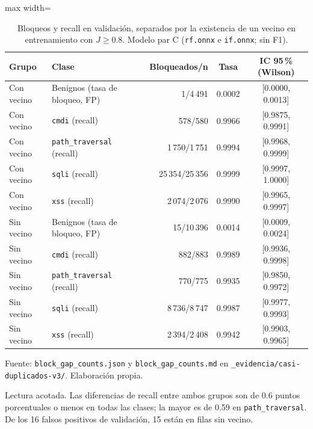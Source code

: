 \begin{table}[htbp]
\centering
\footnotesize
\begin{adjustbox}{max width=\linewidth}
\begin{tabular}{|l|l|r|c|c|}
\hline
\textbf{Grupo} & \textbf{Clase} & \textbf{Bloqueados/n} & \textbf{Tasa} & \textbf{IC 95\,\% (Wilson)} \\ \hline
Con vecino & Benignos (tasa de bloqueo, FP) & 1/4\,491 & 0.0002 & [0.0000, 0.0013] \\ \hline
Con vecino & \texttt{cmdi} (recall) & 578/580 & 0.9966 & [0.9875, 0.9991] \\ \hline
Con vecino & \texttt{path\_traversal} (recall) & 1\,750/1\,751 & 0.9994 & [0.9968, 0.9999] \\ \hline
Con vecino & \texttt{sqli} (recall) & 25\,354/25\,356 & 0.9999 & [0.9997, 1.0000] \\ \hline
Con vecino & \texttt{xss} (recall) & 2\,074/2\,076 & 0.9990 & [0.9965, 0.9997] \\ \hline
Sin vecino & Benignos (tasa de bloqueo, FP) & 15/10\,396 & 0.0014 & [0.0009, 0.0024] \\ \hline
Sin vecino & \texttt{cmdi} (recall) & 882/883 & 0.9989 & [0.9936, 0.9998] \\ \hline
Sin vecino & \texttt{path\_traversal} (recall) & 770/775 & 0.9935 & [0.9850, 0.9972] \\ \hline
Sin vecino & \texttt{sqli} (recall) & 8\,736/8\,747 & 0.9987 & [0.9977, 0.9993] \\ \hline
Sin vecino & \texttt{xss} (recall) & 2\,394/2\,408 & 0.9942 & [0.9903, 0.9965] \\ \hline
\end{tabular}
\end{adjustbox}
\caption{Bloqueos y recall en validación, separados por la existencia de un vecino en entrenamiento con $J \geq 0.8$. Modelo par C (\texttt{rf.onnx} e \texttt{if.onnx}; sin F1).}
\label{tabla:anexo-casi-vecino}
\par\smallskip\footnotesize Fuente: \texttt{block\_gap\_counts.json} y \texttt{block\_gap\_counts.md} en \texttt{\_evidencia/casi-duplicados-v3/}. Elaboración propia.
\end{table}

Lectura acotada. Las diferencias de recall entre ambos grupos son de 0.6 puntos porcentuales o menos en todas las clases; la mayor es de 0.59 en \texttt{path\_traversal}. De los 16 falsos positivos de validación, 15 están en filas sin vecino.

